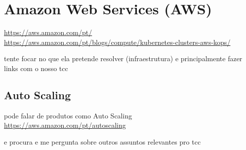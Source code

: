 \chapter{Amazon Web Services (AWS)}

\url{https://aws.amazon.com/pt/}
\url{https://aws.amazon.com/pt/blogs/compute/kubernetes-clusters-aws-kops/}

tente focar no que ela pretende resolver (infraestrutura) e principalmente
fazer links com o nosso tcc

\section{Auto Scaling}
pode falar de produtos como Auto Scaling
\url{https://aws.amazon.com/pt/autoscaling}

e procura e me pergunta sobre outros assuntos relevantes pro tcc
